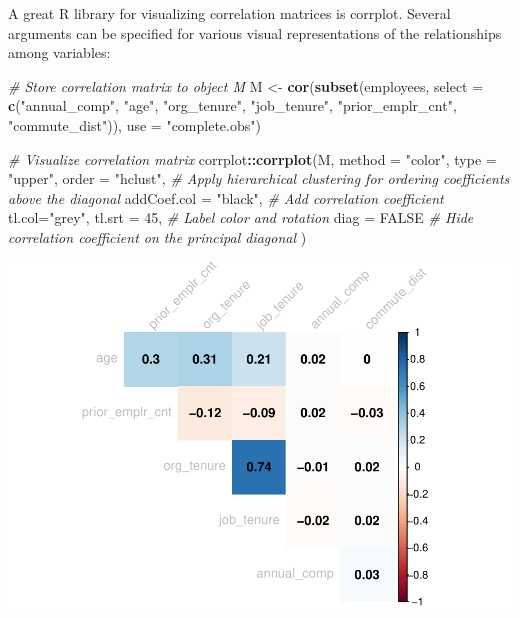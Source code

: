 \documentclass[]{book}
\newenvironment{Shaded}{\begin{snugshade}}{\end{snugshade}}
\newcommand{\CommentTok}[1]{\textcolor[rgb]{0.56,0.35,0.01}{\textit{#1}}}
\newcommand{\DataTypeTok}[1]{\textcolor[rgb]{0.13,0.29,0.53}{#1}}
\newcommand{\DecValTok}[1]{\textcolor[rgb]{0.00,0.00,0.81}{#1}}
\newcommand{\KeywordTok}[1]{\textcolor[rgb]{0.13,0.29,0.53}{\textbf{#1}}}
\newcommand{\NormalTok}[1]{#1}
\newcommand{\OperatorTok}[1]{\textcolor[rgb]{0.81,0.36,0.00}{\textbf{#1}}}
\newcommand{\OtherTok}[1]{\textcolor[rgb]{0.56,0.35,0.01}{#1}}
\newcommand{\StringTok}[1]{\textcolor[rgb]{0.31,0.60,0.02}{#1}}
\begin{document}
A great R library for visualizing correlation matrices is corrplot. Several arguments can be specified for various visual representations of the relationships among variables:

\begin{Shaded}
\begin{Highlighting}[]
\CommentTok{# Store correlation matrix to object M}
\NormalTok{M <-}\StringTok{ }\KeywordTok{cor}\NormalTok{(}\KeywordTok{subset}\NormalTok{(employees, }\DataTypeTok{select =} \KeywordTok{c}\NormalTok{(}\StringTok{"annual_comp"}\NormalTok{, }\StringTok{"age"}\NormalTok{, }\StringTok{"org_tenure"}\NormalTok{, }\StringTok{"job_tenure"}\NormalTok{, }\StringTok{"prior_emplr_cnt"}\NormalTok{, }\StringTok{"commute_dist"}\NormalTok{)), }\DataTypeTok{use =} \StringTok{"complete.obs"}\NormalTok{)}

\CommentTok{# Visualize correlation matrix}
\NormalTok{corrplot}\OperatorTok{::}\KeywordTok{corrplot}\NormalTok{(M, }\DataTypeTok{method =} \StringTok{"color"}\NormalTok{,  }
                   \DataTypeTok{type =} \StringTok{"upper"}\NormalTok{, }\DataTypeTok{order =} \StringTok{"hclust"}\NormalTok{, }\CommentTok{# Apply hierarchical clustering for ordering coefficients above the diagonal}
                   \DataTypeTok{addCoef.col =} \StringTok{"black"}\NormalTok{, }\CommentTok{# Add correlation coefficient}
                   \DataTypeTok{tl.col=}\StringTok{"grey"}\NormalTok{, }\DataTypeTok{tl.srt =} \DecValTok{45}\NormalTok{, }\CommentTok{# Label color and rotation}
                   \DataTypeTok{diag =} \OtherTok{FALSE} \CommentTok{# Hide correlation coefficient on the principal diagonal}
\NormalTok{                   )}
\end{Highlighting}
\end{Shaded}

\includegraphics{People_Analytics_Lifecycle_files/figure-latex/unnamed-chunk-82-1.pdf}
\end{document}
